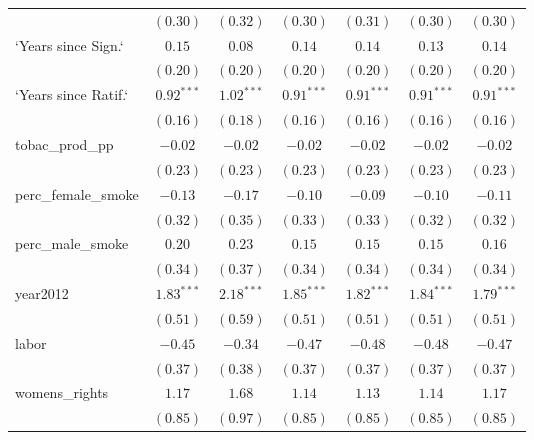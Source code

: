 \begin{table}[!h]
\begin{center}
\begin{tabular}{l c c c c c c }
                        & $(0.30)$     & $(0.32)$     & $(0.30)$     & $(0.31)$     & $(0.30)$     & $(0.30)$     \\
`Years since Sign.`     & $0.15$       & $0.08$       & $0.14$       & $0.14$       & $0.13$       & $0.14$       \\
                        & $(0.20)$     & $(0.20)$     & $(0.20)$     & $(0.20)$     & $(0.20)$     & $(0.20)$     \\
`Years since Ratif.`    & $0.92^{***}$ & $1.02^{***}$ & $0.91^{***}$ & $0.91^{***}$ & $0.91^{***}$ & $0.91^{***}$ \\
                        & $(0.16)$     & $(0.18)$     & $(0.16)$     & $(0.16)$     & $(0.16)$     & $(0.16)$     \\
tobac\_prod\_pp         & $-0.02$      & $-0.02$      & $-0.02$      & $-0.02$      & $-0.02$      & $-0.02$      \\
                        & $(0.23)$     & $(0.23)$     & $(0.23)$     & $(0.23)$     & $(0.23)$     & $(0.23)$     \\
perc\_female\_smoke     & $-0.13$      & $-0.17$      & $-0.10$      & $-0.09$      & $-0.10$      & $-0.11$      \\
                        & $(0.32)$     & $(0.35)$     & $(0.33)$     & $(0.33)$     & $(0.32)$     & $(0.32)$     \\
perc\_male\_smoke       & $0.20$       & $0.23$       & $0.15$       & $0.15$       & $0.15$       & $0.16$       \\
                        & $(0.34)$     & $(0.37)$     & $(0.34)$     & $(0.34)$     & $(0.34)$     & $(0.34)$     \\
year2012                & $1.83^{***}$ & $2.18^{***}$ & $1.85^{***}$ & $1.82^{***}$ & $1.84^{***}$ & $1.79^{***}$ \\
                        & $(0.51)$     & $(0.59)$     & $(0.51)$     & $(0.51)$     & $(0.51)$     & $(0.51)$     \\
labor                   & $-0.45$      & $-0.34$      & $-0.47$      & $-0.48$      & $-0.48$      & $-0.47$      \\
                        & $(0.37)$     & $(0.38)$     & $(0.37)$     & $(0.37)$     & $(0.37)$     & $(0.37)$     \\
womens\_rights          & $1.17$       & $1.68$       & $1.14$       & $1.13$       & $1.14$       & $1.17$       \\
                        & $(0.85)$     & $(0.97)$     & $(0.85)$     & $(0.85)$     & $(0.85)$     & $(0.85)$     \\

\end{tabular}
\end{center}
\end{table}

